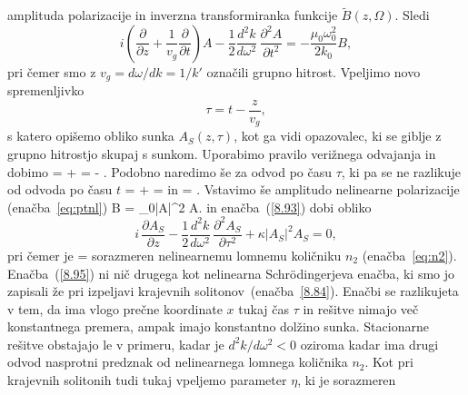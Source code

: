 amplituda polarizacije in inverzna transformiranka 
funkcije $\tilde{B}(z,\Omega)$.
Sledi
\begin{equation}
i (\frac{\partial}{\partial z}+\frac{1}{v_{g}}\frac{\partial}{\partial t})A-
\frac{1}{2}\frac{d^{2}k}{d\omega^{2}}\,\frac{\partial^{2}A}{\partial t^{2}}=
-\frac{\mu_0\omega_0^2}{2 k_0}B,
\label{8.93}
\end{equation}
pri čemer smo z $v_g = d\omega/dk = 1/k'$ označili grupno hitrost.
Vpeljimo novo spremenljivko 
\begin{equation}
\tau=t-\frac{z}{v_{g}},
\end{equation}
s katero opišemo obliko sunka $A_S(z,\tau)$, kot ga vidi opazovalec, ki se giblje
z grupno hitrostjo skupaj s sunkom. Uporabimo pravilo verižnega odvajanja in dobimo
\beq
{} =  + 
=  - .
\eeq
Podobno naredimo še za odvod po času $\tau$, ki pa se ne razlikuje od odvoda po času $t$
\beq
{} = +
=  \qquad \textrm{in} \qquad 
{} = .
\eeq
Vstavimo še amplitudo nelinearne polarizacije (enačba~\ref{eq:ptnl})
\beq
B = \varepsilon_0\chi |A|^2 A.
\eeq
in enačba~(\ref{8.93}) dobi obliko 
\begin{equation}
i\,\frac{\partial A_S}{\partial z}-\frac{1}{2}\frac{d^{2}k}{d\omega^{2}}\,\frac{\partial^{2}A_S}{\partial\tau^{2}}+\kappa\left|A_S\right|^{2}A_S=0,
\label{8.95}
\end{equation}
pri čemer je 
\beq
\kappa = 
\eeq
sorazmeren nelinearnemu lomnemu količniku $n_2$ 
(enačba~\ref{eq:n2}). Enačba~(\ref{8.95}) ni nič drugega kot nelinearna Schr\"odingerjeva 
enačba, ki smo jo 
zapisali že pri izpeljavi krajevnih solitonov~(enačba~\ref{8.84}). Enačbi se razlikujeta v tem, da
ima vlogo prečne koordinate $x$ tukaj čas $\tau$ in rešitve nimajo več konstantnega premera,
ampak imajo konstantno dolžino sunka. Stacionarne rešitve obstajajo le v primeru, kadar je  $d^{2}k/d\omega^{2}<0$ oziroma kadar ima drugi odvod nasprotni predznak od nelinearnega lomnega količnika $n_2$. Kot pri krajevnih solitonih tudi tukaj vpeljemo parameter $\eta$, ki je sorazmeren 
